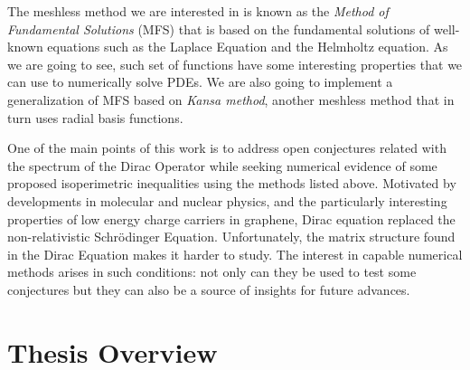 The meshless method we are interested in is known as the \emph{Method of Fundamental Solutions} (MFS) that is based on the fundamental solutions of well-known equations such as the Laplace Equation and the Helmholtz equation. As we are going to see, such set of functions have some interesting properties that we can use to numerically solve PDEs. We are also going to implement a generalization of MFS based on \textit{Kansa method}, another meshless method that in turn uses radial basis functions.

One of the main points of this work is to address open conjectures related with the spectrum of the Dirac Operator while seeking numerical evidence of some proposed isoperimetric inequalities using the methods listed above. Motivated by developments in molecular and nuclear physics, and the particularly interesting properties of low energy charge carriers in graphene, Dirac equation replaced the non-relativistic Schr\"{o}dinger Equation. Unfortunately, the matrix structure found in the Dirac Equation makes it harder to study. The interest in capable numerical methods arises in such conditions: not only can they be used to test some conjectures but they can also be a source of insights for future advances.





\section{Thesis Overview}

